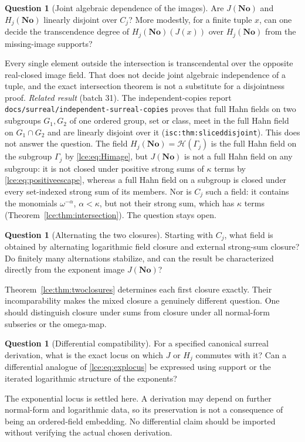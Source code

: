 \documentclass[11pt,letterpaper]{article}
\numberwithin{equation}{section}
\theoremstyle{definition}
\newtheorem{question}[theorem]{Question}
\theoremstyle{remark}
\newcommand{\No}{\mathbf{No}}
\newcommand{\Gam}{\Gamma_j}
\newcommand{\Common}{C_j}
\newcommand{\thref}[1]{Theorem~\ref{#1}}
\newcommand{\lbl}[1]{\nolinkurl{#1}}%
\newcommand{\fn}[1]{\nolinkurl{#1}}%
\begin{document}
\begin{question}[Joint algebraic dependence of the images]\label{lce:q:jointdependence}
Are $J(\No)$ and $H_j(\No)$ linearly disjoint over $\Common$? More
modestly, for a finite tuple $x$, can one decide the transcendence degree
of $H_j(\No)(J(x))$ over $H_j(\No)$ from the missing-image supports?
\end{question}
Every single element outside the intersection is transcendental over
the opposite real-closed image field. That does not decide joint algebraic
independence of a tuple, and the exact intersection theorem is not a
substitute for a disjointness proof.
\emph{Related result} (batch 31). The independent-copies report
\fn{docs/surreal/independent-surreal-copies} proves that full Hahn fields
on two subgroups $G_1,G_2$ of one ordered group, set or class, meet in the
full Hahn field on $G_1\cap G_2$ and are linearly disjoint over it
(\lbl{isc:thm:sliceddisjoint}). This does not answer the question. The field
$H_j(\No)=\mathcal H(\Gam)$ is the full Hahn field on the subgroup $\Gam$
by \eqref{lce:eq:Himage}, but $J(\No)$ is not a full Hahn field on any
subgroup: it is not closed under positive strong sums of $\kappa$ terms
by \eqref{lce:eq:positiveescape}, whereas a full Hahn field on a subgroup is
closed under every set-indexed strong sum of its members. Nor is
$\Common$ such a field: it contains the monomials $\omega^{-\alpha}$,
$\alpha<\kappa$, but not their strong sum, which has $\kappa$ terms
(\thref{lce:thm:intersection}).
The question stays open.

\begin{question}[Alternating the two closures]\label{lce:q:closures}
Starting with $\Common$, what field is obtained by alternating logarithmic
field closure and external strong-sum closure? Do finitely many alternations
stabilize, and can the result be characterized directly from the exponent
image $J(\No)$?
\end{question}
\thref{lce:thm:twoclosures} determines each first closure exactly. Their
incomparability makes the mixed closure a genuinely different question.
One should distinguish closure under sums from closure under all normal-form
subseries or the omega-map.

\begin{question}[Differential compatibility]\label{lce:q:differential}
For a specified canonical surreal derivation, what is the exact locus on
which $J$ or $H_j$ commutes with it? Can a differential analogue of
\eqref{lce:eq:explocus} be expressed using support or the iterated logarithmic
structure of the exponents?
\end{question}
The exponential locus is settled here. A derivation may depend on further
normal-form and logarithmic data, so its preservation is not a consequence
of being an ordered-field embedding. No differential claim should be
imported without verifying the actual chosen derivation.
\end{document}
